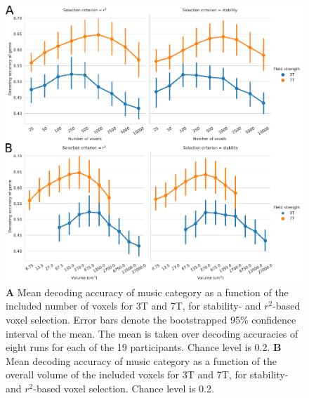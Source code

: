 \begin{figure}
  \centering
  \includegraphics[width=\linewidth]{pics/decoding_genre.pdf}

  \caption{\textbf{A} Mean decoding accuracy of music category as a function of
  the included number of voxels for 3T and 7T, for stability- and
  $r^2$-based voxel selection. Error bars denote the bootstrapped 95\%
  confidence interval of the mean. The mean is taken over decoding
  accuracies of eight runs for each of the 19 participants. Chance level is 0.2. \textbf{B} Mean
decoding accuracy of music category as a function of the overall volume of the
included voxels for 3T and 7T, for stability- and $r^2$-based voxel
selection. Chance level is 0.2.
}

 \label{fig:decoding_accuracy}
\end{figure}

